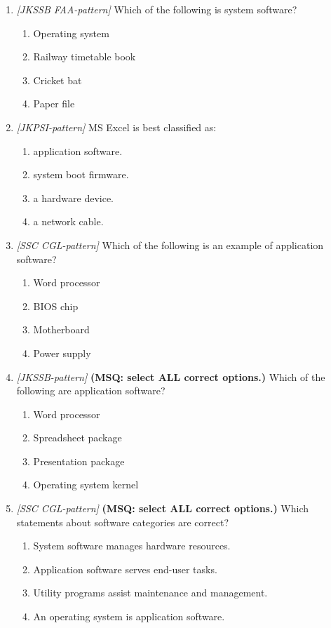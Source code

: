 \documentclass[11pt]{article}
\begin{document}
\begin{enumerate}[label=\textbf{Q\arabic*.}, leftmargin=*]
\item \textit{[JKSSB FAA-pattern]} Which of the following is system software?
  \begin{enumerate}[label=\Alph*.]
    \item Operating system
    \item Railway timetable book
    \item Cricket bat
    \item Paper file
  \end{enumerate}
\item \textit{[JKPSI-pattern]} MS Excel is best classified as:
  \begin{enumerate}[label=\Alph*.]
    \item application software.
    \item system boot firmware.
    \item a hardware device.
    \item a network cable.
  \end{enumerate}
\item \textit{[SSC CGL-pattern]} Which of the following is an example of application software?
  \begin{enumerate}[label=\Alph*.]
    \item Word processor
    \item BIOS chip
    \item Motherboard
    \item Power supply
  \end{enumerate}
\item \textit{[JKSSB-pattern]} \textbf{(MSQ: select ALL correct options.)} Which of the following are application software?
  \begin{enumerate}[label=\Alph*.]
    \item Word processor
    \item Spreadsheet package
    \item Presentation package
    \item Operating system kernel
  \end{enumerate}
\item \textit{[SSC CGL-pattern]} \textbf{(MSQ: select ALL correct options.)} Which statements about software categories are correct?
  \begin{enumerate}[label=\Alph*.]
    \item System software manages hardware resources.
    \item Application software serves end-user tasks.
    \item Utility programs assist maintenance and management.
    \item An operating system is application software.
  \end{enumerate}
\end{enumerate}
\def\JKSSBLessonID{18}\def\JKSSBAnswers{0}
\end{document}
